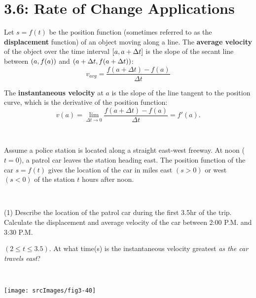 \documentclass[answers]{exam}
\begin{document}
\section{3.6: Rate of Change Applications}
\begin{defn*}
  Let $s=f(t)$ be the position function (sometimes referred to as the \textbf{displacement} function) of an object moving along a line. The \textbf{average velocity} of the object over the time interval ${\left[a,a+\Delta t\right]}$ is the slope of the secant line between ${\left(a,f(a)\right)}$ and ${\left(a+\Delta t,f(a+\Delta t)\right)}$:
    $$v_{avg}=\frac{f(a+\Delta t)-f(a)}{\Delta t}$$
  
  The \textbf{instantaneous velocity} at $a$ is the slope of the line tangent to the position curve, which is the derivative of the position function:
    $$v(a)=\lim_{\Delta t \to 0} \frac{f(a+\Delta t)-f(a)}{\Delta t}=f'(a).$$
\end{defn*}

\begin{ex*}\ 

\noindent
Assume a police station is located along a straight east-west freeway. At noon ($t=0$), a patrol car leaves the station heading east. The position function of the car $s=f(t)$ gives the location of the car in miles east $(s>0)$ or west $(s<0)$ of the station $t$ hours after noon.
\end{ex*}
\vspace*{-20pt}
\begin{minipage}[t]{0.6\linewidth}\ 

  \begin{tasks}(1)
    \task Describe the location of the patrol car during the first 3.5hr of the trip.
    \task Calculate the displacement and average velocity of the car between 2:00 P.M. and 3:30 P.M. 
    
    $(2\leq t\leq3.5)$.
    \task At what time(s) is the instantaneous velocity greatest \textit{as the car travels east}?
  \end{tasks}
\end{minipage}%
\begin{minipage}[t]{0.4\linewidth}\ 

  \begin{flushright}
    \texttt{[image: srcImages/fig3-40]}
  \end{flushright}
\end{minipage}
\end{document}
